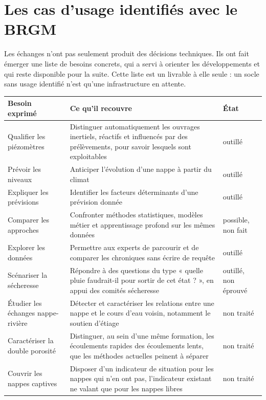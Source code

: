 \section{Les cas d'usage identifiés avec le BRGM}

Les échanges n'ont pas seulement produit des décisions techniques. Ils ont fait émerger une
liste de besoins concrets, qui a servi à orienter les développements et qui reste disponible
pour la suite. Cette liste est un livrable à elle seule : un socle sans usage identifié n'est qu'une
infrastructure en attente.

\begin{center}
\begin{tabularx}{\textwidth}{@{}lXl@{}}
\toprule
\textbf{Besoin exprimé} & \textbf{Ce qu'il recouvre} & \textbf{État} \\
\midrule
Qualifier les piézomètres & Distinguer automatiquement les ouvrages inertiels, réactifs et
influencés par des prélèvements, pour savoir lesquels sont exploitables & outillé \\
Prévoir les niveaux & Anticiper l'évolution d'une nappe à partir du climat & outillé \\
Expliquer les prévisions & Identifier les facteurs déterminants d'une prévision donnée &
outillé \\
Comparer les approches & Confronter méthodes statistiques, modèles métier et apprentissage
profond sur les mêmes données & possible, non fait \\
Explorer les données & Permettre aux experts de parcourir et de comparer les chroniques sans
écrire de requête & outillé \\
Scénariser la sécheresse & Répondre à des questions du type « quelle pluie faudrait-il pour
sortir de cet état ? », en appui des comités sécheresse & outillé, non éprouvé \\
Étudier les échanges nappe-rivière & Détecter et caractériser les relations entre une nappe et
le cours d'eau voisin, notamment le soutien d'étiage & non traité \\
Caractériser la double porosité & Distinguer, au sein d'une même formation, les écoulements
rapides des écoulements lents, que les méthodes actuelles peinent à séparer & non traité \\
Couvrir les nappes captives & Disposer d'un indicateur de situation pour les nappes qui n'en ont
pas, l'indicateur existant ne valant que pour les nappes libres & non traité \\
\bottomrule
\end{tabularx}
\end{center}

